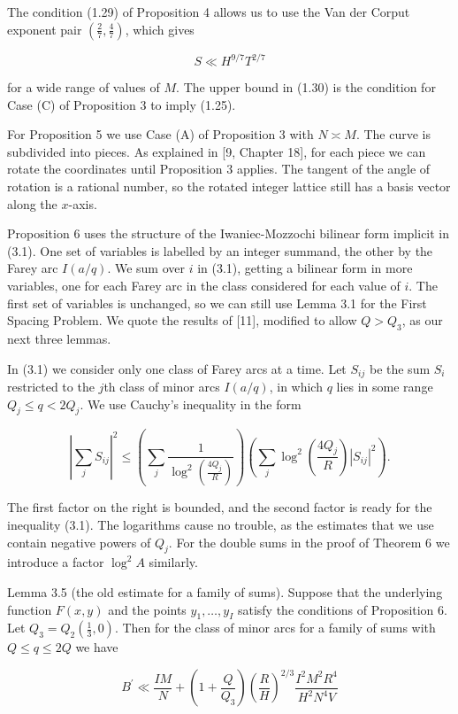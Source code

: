 \documentclass[10pt]{article}
\begin{document}
The condition (1.29) of Proposition 4 allows us to use the Van der Corput exponent pair $\left(\frac{2}{7}, \frac{4}{7}\right)$, which gives

$$
S \ll H^{9 / 7} T^{2 / 7}
$$

for a wide range of values of $M$. The upper bound in (1.30) is the condition for Case (C) of Proposition 3 to imply (1.25).

For Proposition 5 we use Case (A) of Proposition 3 with $N \asymp M$. The curve is subdivided into pieces. As explained in [9, Chapter 18], for each piece we can rotate the coordinates until Proposition 3 applies. The tangent of the angle of rotation is a rational number, so the rotated integer lattice still has a basis vector along the $x$-axis.

Proposition 6 uses the structure of the Iwaniec-Mozzochi bilinear form implicit in (3.1). One set of variables is labelled by an integer summand, the other by the Farey arc $I(a / q)$. We sum over $i$ in (3.1), getting a bilinear form in more variables, one for each Farey arc in the class considered for each value of $i$. The first set of variables is unchanged, so we can still use Lemma 3.1 for the First Spacing Problem. We quote the results of [11], modified to allow $Q>Q_{3}$, as our next three lemmas.

In (3.1) we consider only one class of Farey arcs at a time. Let $S_{i j}$ be the sum $S_{i}$ restricted to the $j$th class of minor arcs $I(a / q)$, in which $q$ lies in some range $Q_{j} \leqslant q<2Q_{j}$. We use Cauchy's inequality in the form

$$
\left|\sum_{j} S_{i j}\right|^{2} \leqslant\left(\sum_{j} \frac{1}{\log^{2}\left(\frac{4Q_{j}}{R}\right)}\right)\left(\sum_{j}\log^{2}\left(\frac{4Q_{j}}{R}\right)\left|S_{i j}\right|^{2}\right).
$$

The first factor on the right is bounded, and the second factor is ready for the inequality (3.1). The logarithms cause no trouble, as the estimates that we use contain negative powers of $Q_{j}$. For the double sums in the proof of Theorem 6 we introduce a factor $\log ^{2} A$ similarly.

Lemma 3.5 (the old estimate for a family of sums). Suppose that the underlying function $F(x, y)$ and the points $y_{1}, \ldots, y_{I}$ satisfy the conditions of Proposition 6. Let $Q_{3}=Q_{2}\left(\frac{1}{3}, 0\right)$. Then for the class of minor arcs for a family of sums with $Q \leqslant q \leqslant 2 Q$ we have


\begin{equation*}
B^{\prime} \ll \frac{I M}{N}+\left(1+\frac{Q}{Q_{3}}\right)\left(\frac{R}{H}\right)^{2 / 3} \frac{I^{2} M^{2} R^{4}}{H^{2} N^{4} V} \tag{3.32}
\end{equation*}
\end{document}
